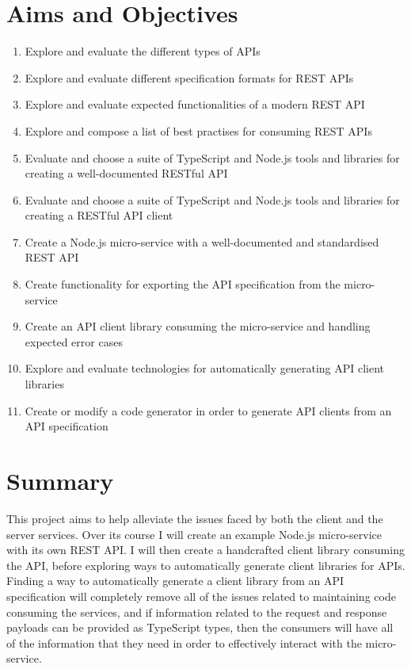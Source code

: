 \section{Aims and Objectives}
 \begin{enumerate}
   \item Explore and evaluate the different types of APIs
   \item Explore and evaluate different specification formats for REST APIs
   \item Explore and evaluate expected functionalities of a modern REST API
   \item Explore and compose a list of best practises for consuming REST APIs
   \item Evaluate and choose a suite of TypeScript and Node.js tools and libraries for creating a well-documented RESTful API
   \item Evaluate and choose a suite of TypeScript and Node.js tools and libraries for creating a RESTful API client
   \item Create a Node.js micro-service with a well-documented and standardised REST API
   \item Create functionality for exporting the API specification from the micro-service
   \item Create an API client library consuming the micro-service and handling expected error cases
   \item Explore and evaluate technologies for automatically generating API client libraries
   \item Create or modify a code generator in order to generate API clients from an API specification
 \end{enumerate} 
 \section{Summary}
 
 This project aims to help alleviate the issues faced by both the client and the server services. Over its course I will create an example Node.js micro-service with its own REST API. I will then create a handcrafted client library consuming the API, before exploring ways to automatically generate client libraries for APIs. Finding a way to automatically generate a client library from an API specification will completely remove all of the issues related to maintaining code consuming the services, and if information related to the request and response payloads can be provided as TypeScript types, then the consumers will have all of the information that they need in order to effectively interact with the micro-service.